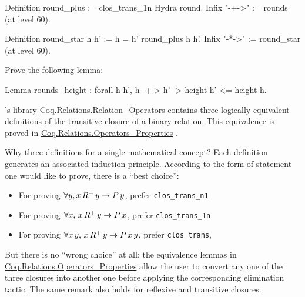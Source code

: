 \label{sect:infix-rounds} 

\begin{Coqsrc}
Definition round_plus := clos_trans_1n Hydra round.
Infix "-+->" := rounds (at level 60).

Definition round_star h h' := h = h' \/ round_plus h h'.
Infix "-*->" := round_star (at level 60).
\end{Coqsrc}



\begin{exercise}
Prove the following lemma:

\begin{Coqsrc}
Lemma rounds_height : forall h h', 
   h -+-> h' -> height h' <= height h.  
\end{Coqsrc}
  
\end{exercise}

\begin{remark}
\label{remark:transitive-closure}
\coq's library \href{https://coq.inria.fr/distrib/current/stdlib/Coq.Relations.Relation_Operators.html}{Coq.Relations.Relation\_Operators} 
contains three logically equivalent definitions of the transitive closure of a binary relation. This equivalence is proved in 
\href{https://coq.inria.fr/distrib/current/stdlib/Coq.Relations.Operators_Properties.html}{Coq.Relations.Operators\_Properties} . 

Why three definitions for a single mathematical concept?
Each definition generates an associated induction principle. 
 According to the form of statement one would like to prove, there is a ``best choice'':

\begin{itemize}
\item For proving $\forall y, x\,R^+\,y \;\mbox{$\rightarrow$}\; P\,y$, prefer 
\texttt{clos\_trans\_n1}
\item For proving $\forall x,\,x\,R^+\,y \;\mbox{$\rightarrow$}\; P\,x$, prefer \texttt{clos\_trans\_1n}
\item For proving $\forall x\,y, \,x\,R^+\,y \;\mbox{$\rightarrow$}\;P\,x\,y$,  
prefer \texttt{clos\_trans},
\end{itemize}
But there is no ``wrong choice'' at all: the equivalence lemmas in \linebreak 
\href{https://coq.inria.fr/distrib/current/stdlib/Coq.Relations.Operators_Properties.html}{Coq.Relations.Operators\_Properties} 
 allow the user
to convert any one of the three closures into another one before applying the corresponding elimination tactic.
The same remark also holds for reflexive and transitive closures. 
\end{remark}

